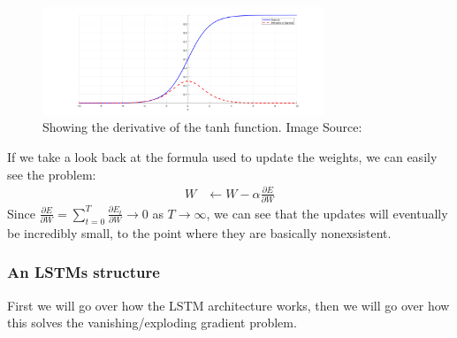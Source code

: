 \begin{figure}[h]
    \centering
        \includegraphics[width=0.75\textwidth]{latex/imgs/tanh_deriv.png}
    \caption{Showing the derivative of the tanh function. Image Source:\cite{grad}}
    \label{fig:tanh_deriv}
\end{figure}
If we take a look back at the formula used to update the weights, we can easily see the problem:
\begin{align}
    W &\leftarrow W - \alpha \frac{\partial E}{\partial W}
\end{align}
Since $\frac{\partial E}{\partial W} = \sum_{t=0}^{T} \frac{\partial E_t}{\partial W} \rightarrow 0$ as $T \rightarrow \infty$, we can see that the updates will eventually be incredibly small, to the point where they are basically nonexsistent.

\subsubsection{An LSTMs structure}
First we will go over how the LSTM architecture works, then we will go over how this solves the vanishing/exploding gradient problem.\\

